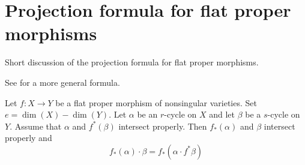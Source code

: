 \section{Projection formula for flat proper morphisms}
\label{section-projection-formula-flat}

\noindent
Short discussion of the projection formula for flat proper morphisms.

\begin{lemma}
\label{lemma-projection-formula-flat}
\begin{reference}
See \cite[Chapter V, Section 7, formula (10)]{Serre_algebre_locale}
for a more general formula.
\end{reference}
Let $f : X \to Y$ be a flat proper morphism of nonsingular varieties.
Set $e = \dim(X) - \dim(Y)$. Let $\alpha$ be an $r$-cycle on $X$ and let
$\beta$ be a $s$-cycle on $Y$. Assume that $\alpha$ and $f^*(\beta)$ intersect
properly. Then $f_*(\alpha)$ and $\beta$ intersect properly and
$$
f_*(\alpha) \cdot \beta = f_*( \alpha \cdot f^*\beta)
$$
\end{lemma}

